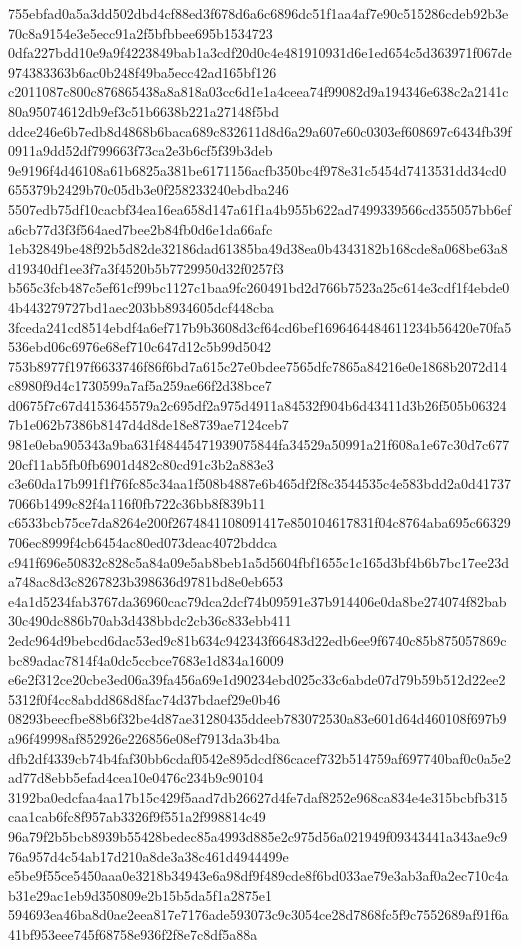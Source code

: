 \documentclass[11pt,a4paper]{article}
\begin{document}
{755ebfad0a5a3dd502dbd4cf88ed3f678d6a6c6896dc51f1aa4af7e90c515286cdeb92b3e70c8a9154e3e5ecc91a2f5bfbbee695b1534723
0dfa227bdd10e9a9f4223849bab1a3cdf20d0c4e481910931d6e1ed654c5d363971f067de974383363b6ac0b248f49ba5ecc42ad165bf126
c2011087c800c876865438a8a818a03cc6d1e1a4ceea74f99082d9a194346e638c2a2141c80a95074612db9ef3c51b6638b221a27148f5bd
ddce246e6b7edb8d4868b6baca689c832611d8d6a29a607e60c0303ef608697c6434fb39f0911a9dd52df799663f73ca2e3b6cf5f39b3deb
9e9196f4d46108a61b6825a381be6171156acfb350bc4f978e31c5454d7413531dd34cd0655379b2429b70c05db3e0f258233240ebdba246
5507edb75df10cacbf34ea16ea658d147a61f1a4b955b622ad7499339566cd355057bb6efa6cb77d3f3f564aed7bee2b84fb0d6e1da66afc
1eb32849be48f92b5d82de32186dad61385ba49d38ea0b4343182b168cde8a068be63a8d19340df1ee3f7a3f4520b5b7729950d32f0257f3
b565c3fcb487c5ef61cf99bc1127c1baa9fc260491bd2d766b7523a25c614e3cdf1f4ebde04b443279727bd1aec203bb8934605dcf448cba
3fceda241cd8514ebdf4a6ef717b9b3608d3cf64cd6bef1696464484611234b56420e70fa5536ebd06c6976e68ef710c647d12c5b99d5042
753b8977f197f6633746f86f6bd7a615c27e0bdee7565dfc7865a84216e0e1868b2072d14c8980f9d4c1730599a7af5a259ae66f2d38bce7
d0675f7c67d4153645579a2c695df2a975d4911a84532f904b6d43411d3b26f505b063247b1e062b7386b8147d4d8de18e8739ae7124ceb7
981e0eba905343a9ba631f48445471939075844fa34529a50991a21f608a1e67c30d7c67720cf11ab5fb0fb6901d482c80cd91c3b2a883e3
c3e60da17b991f1f76fc85c34aa1f508b4887e6b465df2f8c3544535c4e583bdd2a0d417377066b1499c82f4a116f0fb722c36bb8f839b11
c6533bcb75ce7da8264e200f2674841108091417e850104617831f04c8764aba695c66329706ec8999f4cb6454ac80ed073deac4072bddca
c941f696e50832c828c5a84a09e5ab8beb1a5d5604fbf1655c1c165d3bf4b6b7bc17ee23da748ac8d3c8267823b398636d9781bd8e0eb653
e4a1d5234fab3767da36960cac79dca2dcf74b09591e37b914406e0da8be274074f82bab30c490dc886b70ab3d438bbdc2cb36c833ebb411
2edc964d9bebcd6dac53ed9c81b634c942343f66483d22edb6ee9f6740c85b875057869cbc89adac7814f4a0dc5ccbce7683e1d834a16009
e6e2f312ce20cbe3ed06a39fa456a69e1d90234ebd025c33c6abde07d79b59b512d22ee25312f0f4cc8abdd868d8fac74d37bdaef29e0b46
08293beecfbe88b6f32be4d87ae31280435ddeeb783072530a83e601d64d460108f697b9a96f49998af852926e226856e08ef7913da3b4ba
dfb2df4339cb74b4faf30bb6cdaf0542e895dcdf86cacef732b514759af697740baf0c0a5e2ad77d8ebb5efad4cea10e0476c234b9c90104
3192ba0edcfaa4aa17b15c429f5aad7db26627d4fe7daf8252e968ca834e4e315bcbfb315caa1cab6fc8f957ab3326f9f551a2f998814c49
96a79f2b5bcb8939b55428bedec85a4993d885e2c975d56a021949f09343441a343ae9c976a957d4c54ab17d210a8de3a38c461d4944499e
e5be9f55ce5450aaa0e3218b34943e6a98df9f489cde8f6bd033ae79e3ab3af0a2ec710c4ab31e29ac1eb9d350809e2b15b5da5f1a2875e1
594693ea46ba8d0ae2eea817e7176ade593073c9c3054ce28d7868fc5f9c7552689af91f6a41bf953eee745f68758e936f2f8e7c8df5a88a
}
\end{document}
